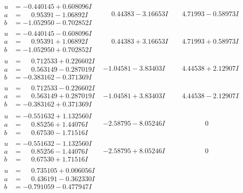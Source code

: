 \documentclass[1p]{elsarticle_modified}
\theoremstyle{definition}
\begin{document}
$$\begin{array}{c|c|c}
\begin{aligned}
u &= -0.440145 + 0.608096 I \\
a &= \phantom{-}0.95391 - 1.06892 I \\
b &= -1.052950 - 0.702852 I\end{aligned}
 & \phantom{-}0.44383 - 3.16653 I & \phantom{-}4.71993 - 0.58973 I \\ \hline\begin{aligned}
u &= -0.440145 - 0.608096 I \\
a &= \phantom{-}0.95391 + 1.06892 I \\
b &= -1.052950 + 0.702852 I\end{aligned}
 & \phantom{-}0.44383 + 3.16653 I & \phantom{-}4.71993 + 0.58973 I \\ \hline\begin{aligned}
u &= \phantom{-}0.712533 + 0.226602 I \\
a &= \phantom{-}0.563149 - 0.287019 I \\
b &= -0.383162 - 0.371369 I\end{aligned}
 & -1.04581 - 3.83403 I & \phantom{-}4.44538 + 2.12907 I \\ \hline\begin{aligned}
u &= \phantom{-}0.712533 - 0.226602 I \\
a &= \phantom{-}0.563149 + 0.287019 I \\
b &= -0.383162 + 0.371369 I\end{aligned}
 & -1.04581 + 3.83403 I & \phantom{-}4.44538 - 2.12907 I \\ \hline\begin{aligned}
u &= -0.551632 + 1.132560 I \\
a &= \phantom{-}0.85256 + 1.44076 I \\
b &= \phantom{-}0.67530 - 1.71516 I\end{aligned}
 & -2.58795 - 8.05246 I & \phantom{-0.000000 } 0 \\ \hline\begin{aligned}
u &= -0.551632 - 1.132560 I \\
a &= \phantom{-}0.85256 - 1.44076 I \\
b &= \phantom{-}0.67530 + 1.71516 I\end{aligned}
 & -2.58795 + 8.05246 I & \phantom{-0.000000 } 0 \\ \hline\begin{aligned}
u &= \phantom{-}0.735105 + 0.006056 I \\
a &= \phantom{-}0.436191 - 0.362330 I \\
b &= -0.791059 - 0.477947 I\end{aligned}

\end{array}$$
\end{document}
